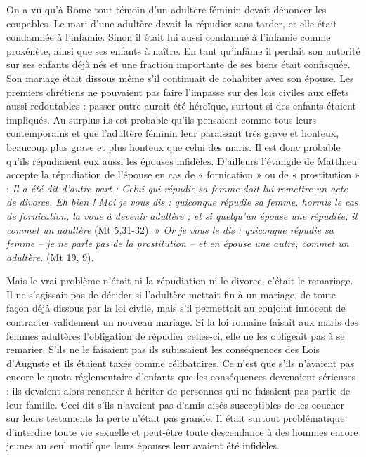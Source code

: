  On a vu qu'à Rome tout témoin d'un adultère féminin devait dénoncer les coupables. Le mari d'une adultère devait la répudier sans tarder, et elle était condamnée à l'infamie. Sinon il était lui aussi condamné à l'infamie comme proxénète, ainsi que ses enfants à naître. En tant qu'infâme il perdait son autorité sur ses enfants déjà nés et une fraction importante de ses biens était confisquée. Son mariage était dissous même s'il continuait de cohabiter avec son épouse. Les premiers chrétiens ne pouvaient pas faire l'impasse sur des lois civiles aux effets aussi redoutables : passer outre aurait été héroïque, surtout si des enfants étaient impliqués. Au surplus ils est probable qu'ils pensaient comme tous leurs contemporains et que l'adultère féminin leur paraissait très grave et honteux, beaucoup plus grave et plus honteux que celui des maris. Il est donc probable qu'ils répudiaient eux aussi les épouses infidèles. D'ailleurs l'évangile de Matthieu accepte la répudiation de l'épouse en cas de « fornication » ou de « prostitution »  : \emph{Il a été dit d'autre part : Celui qui répudie sa femme doit lui remettre un acte de divorce. Eh bien ! Moi je vous dis : quiconque répudie sa femme, hormis le cas de fornication, la voue à devenir adultère ; et si quelqu'un épouse une répudiée, il commet un adultère} (Mt 5,31-32). » \emph{Or je vous le dis : quiconque répudie sa femme -- je ne parle pas de la prostitution -- et en épouse une autre, commet un adultère.} (Mt 19, 9). 

 Mais le vrai problème n'était ni la répudiation ni le divorce, c'était le remariage. Il ne s'agissait pas de décider si l'adultère mettait fin à un mariage, de toute façon déjà dissous par la loi civile, mais s'il permettait au conjoint innocent de contracter validement un nouveau mariage. Si la loi romaine faisait aux maris des femmes adultères l'obligation de répudier celles-ci, elle ne les obligeait pas à se remarier. S'ils ne le faisaient pas ils subissaient les conséquences des Lois d'Auguste et ils étaient taxés comme célibataires. Ce n'est que s'ils n'avaient pas encore le quota réglementaire d'enfants que les conséquences devenaient sérieuses : ils devaient alors renoncer à hériter de personnes qui ne faisaient pas partie de leur famille. Ceci dit s'ils n'avaient pas d'amis aisés susceptibles de les coucher sur leurs testaments la perte n'était pas grande. Il était surtout problématique d'interdire toute vie sexuelle et peut-être toute descendance à des hommes encore jeunes au seul motif que leurs épouses leur avaient été infidèles. 

